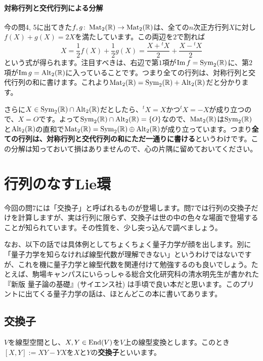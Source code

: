 \paragraph{対称行列と交代行列による分解}

今の問4, 5に出てきた$f, g\colon \operatorname{Mat}_2(\mathbb{R}) \rightarrow \operatorname{Mat}_2(\mathbb{R})$は、全ての$n$次正方行列$X$に対し$f(X) + g(X) = 2X$を満たしています。この両辺を$2$で割れば
\[
X = \frac{1}{2} f(X) + \frac{1}{2} g(X)
= \frac{X + {}^tX}{2} + \frac{X - {}^tX}{2}
\]
という式が得られます。注目すべきは、右辺で第$1$項が$\mathrm{Im}\, f = \operatorname{Sym}_2(\mathbb{R})$に、第$2$項が$\mathrm{Im}\, g = \operatorname{Alt}_2(\mathbb{R})$に入っていることです。つまり全ての行列は、対称行列と交代行列の和に書けます。これより$\operatorname{Mat}_2(\mathbb{R}) = \operatorname{Sym}_2(\mathbb{R}) + \operatorname{Alt}_2(\mathbb{R})$だと分かります。

さらに$X \in \operatorname{Sym}_2(\mathbb{R}) \cap \operatorname{Alt}_2(\mathbb{R})$だとしたら、${}^tX = X$かつ${}^tX = -X$が成り立つので、$X = O$です。よって$\operatorname{Sym}_2(\mathbb{R}) \cap \operatorname{Alt}_2(\mathbb{R}) = \{O\}$なので、$\operatorname{Mat}_2(\mathbb{R})$は$\operatorname{Sym}_2(\mathbb{R})$と$\operatorname{Alt}_2(\mathbb{R})$の直和で$\operatorname{Mat}_2(\mathbb{R}) = \operatorname{Sym}_2(\mathbb{R}) \oplus \operatorname{Alt}_2(\mathbb{R})$が成り立っています。つまり\textbf{全ての行列は、対称行列と交代行列の和にただ一通りに書ける}というわけです。この分解は知っておいて損はありませんので、心の片隅に留めておいてください。

\section{行列のなすLie環}

今回の問7には「交換子」と呼ばれるものが登場します。問7では行列の交換子だけを計算しますが、実は行列に限らず、交換子は世の中の色々な場面で登場することが知られています。その性質を、少し突っ込んで調べましょう。

なお、以下の話では具体例としてちょくちょく量子力学が顔を出します。別に「量子力学を知らなければ線型代数が理解できない」というわけではないですが、これを機に量子力学と線型代数を関連付けて勉強するのも良いでしょう。たとえば、駒場キャンパスにいらっしゃる総合文化研究科の清水明先生が書かれた『新版 量子論の基礎』(サイエンス社) は手頃で良い本だと思います。このプリントに出てくる量子力学の話は、ほとんどこの本に書いてあります。

\subsection{交換子}

$V$を線型空間とし、$X, Y \in \operatorname{End}(V)$を$V$上の線型変換とします。このとき$[X, Y] := XY - YX$を$X$と$Y$の\textbf{交換子}といいます。

